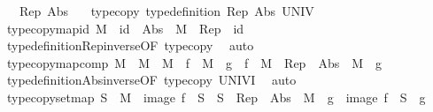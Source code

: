 \begin{isabellebody}
\ \ \ Rep\ Abs\isanewline
\ \ \ type{\isacharunderscore}{\kern0pt}copy{\isacharcolon}{\kern0pt}\ {\isachardoublequoteopen}type{\isacharunderscore}{\kern0pt}definition\ Rep\ Abs\ UNIV{\isachardoublequoteclose}\isanewline
{}\isanewline
\isanewline
{}\isamarkupfalse%
\ type{\isacharunderscore}{\kern0pt}copy{\isacharunderscore}{\kern0pt}map{\isacharunderscore}{\kern0pt}id{}{\isacharcolon}{\kern0pt}\ {\isachardoublequoteopen}M\ {\isacharequal}{\kern0pt}\ id\ {\isasymLongrightarrow}\ Abs\ {\isasymcirc}\ M\ {\isasymcirc}\ Rep\ {\isacharequal}{\kern0pt}\ id{\isachardoublequoteclose}\isanewline
%
\isadelimproof
\ \ %
\endisadelimproof
%
\isatagproof
{}\isamarkupfalse%
\ type{\isacharunderscore}{\kern0pt}definition{\isachardot}{\kern0pt}Rep{\isacharunderscore}{\kern0pt}inverse{\isacharbrackleft}{\kern0pt}OF\ type{\isacharunderscore}{\kern0pt}copy{\isacharbrackright}{\kern0pt}\ \isamarkupfalse%
\ auto%
\endisatagproof
{\isafoldproof}%
%
\isadelimproof
\isanewline
%
\endisadelimproof
\isanewline
{}\isamarkupfalse%
\ type{\isacharunderscore}{\kern0pt}copy{\isacharunderscore}{\kern0pt}map{\isacharunderscore}{\kern0pt}comp{}{\isacharcolon}{\kern0pt}\ {\isachardoublequoteopen}M\ {\isacharequal}{\kern0pt}\ M{}\ {\isasymcirc}\ M{}\ {\isasymLongrightarrow}\ f\ {\isasymcirc}\ M\ {\isasymcirc}\ g\ {\isacharequal}{\kern0pt}\ {\isacharparenleft}{\kern0pt}f\ {\isasymcirc}\ M{}\ {\isasymcirc}\ Rep{\isacharparenright}{\kern0pt}\ {\isasymcirc}\ {\isacharparenleft}{\kern0pt}Abs\ {\isasymcirc}\ M{}\ {\isasymcirc}\ g{\isacharparenright}{\kern0pt}{\isachardoublequoteclose}\isanewline
%
\isadelimproof
\ \ %
\endisadelimproof
%
\isatagproof
{}\isamarkupfalse%
\ type{\isacharunderscore}{\kern0pt}definition{\isachardot}{\kern0pt}Abs{\isacharunderscore}{\kern0pt}inverse{\isacharbrackleft}{\kern0pt}OF\ type{\isacharunderscore}{\kern0pt}copy\ UNIV{\isacharunderscore}{\kern0pt}I{\isacharbrackright}{\kern0pt}\ \isamarkupfalse%
\ auto%
\endisatagproof
{\isafoldproof}%
%
\isadelimproof
\isanewline
%
\endisadelimproof
\isanewline
{}\isamarkupfalse%
\ type{\isacharunderscore}{\kern0pt}copy{\isacharunderscore}{\kern0pt}set{\isacharunderscore}{\kern0pt}map{}{\isacharcolon}{\kern0pt}\ {\isachardoublequoteopen}S\ {\isasymcirc}\ M\ {\isacharequal}{\kern0pt}\ image\ f\ {\isasymcirc}\ S{\isacharprime}{\kern0pt}\ {\isasymLongrightarrow}\ {\isacharparenleft}{\kern0pt}S\ {\isasymcirc}\ Rep{\isacharparenright}{\kern0pt}\ {\isasymcirc}\ {\isacharparenleft}{\kern0pt}Abs\ {\isasymcirc}\ M\ {\isasymcirc}\ g{\isacharparenright}{\kern0pt}\ {\isacharequal}{\kern0pt}\ image\ f\ {\isasymcirc}\ {\isacharparenleft}{\kern0pt}S{\isacharprime}{\kern0pt}\ {\isasymcirc}\ g{\isacharparenright}{\kern0pt}{\isachardoublequoteclose}\isanewline

\end{isabellebody}
